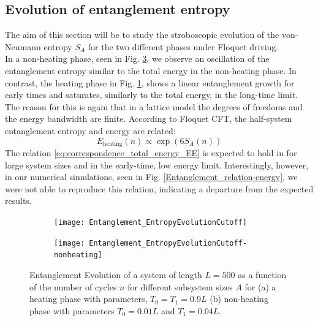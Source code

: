 \documentclass[11pt, a4paper, oneside]{book}
\theoremstyle{definition} %
\begin{document}
\subsection{Evolution of entanglement entropy}
The aim of this section will be to study the stroboscopic evolution of the von-Neumann entropy $S_A$ for the two different phases under Floquet driving. \\

In a non-heating phase, seen in Fig. \ref{EntanglementEvolutionNonHeating}, we observe an oscillation of the entanglement entropy similar to the total energy in the non-heating phase. In contrast, the heating phase in Fig. \ref{EntanglementEvolutionHeating}, shows a linear entanglement growth for early times and saturates, similarly to the total energy, in the long-time limit. The reason for this is again that in a lattice model the degrees of freedoms and the energy bandwidth are finite. According to Floquet CFT, the half-system entanglement entropy and energy are related:
\begin{equation}
	E_\text{heating}(n) \propto \exp(6S_A(n))
	\label{eq:correspondence_total_energy_EE}
\end{equation}
The relation \ref{eq:correspondence_total_energy_EE} is expected to hold in for large system sizes and in the early-time, low energy limit. Interestingly, however, in our numerical simulations, seen in Fig. \ref{Entanglement_relation-energy}, we were not able to reproduce this relation, indicating a departure from the expected results.


\begin{figure}[h]
\centering
\begin{subfigure}[t]{0.49\textwidth}
	\centering
	\texttt{[image: Entanglement\_EntropyEvolutionCutoff]}
	\caption{}
	\label{EntanglementEvolutionHeating}
\end{subfigure}
\begin{subfigure}[t]{0.49\textwidth}
	\centering
	\texttt{[image: Entanglement\_EntropyEvolutionCutoff-nonheating]}
	\caption{}
	\label{EntanglementEvolutionNonHeating}
\end{subfigure}
\caption{Entanglement Evolution of a system of length $L = 500$ as a function of the number of cycles $n$ for different subsystem sizes $A$ for (a) a heating phase with parameters, $T_0 = T_1 =0.9L$ (b) non-heating phase with parameters $T_0 = 0.01L$ and $T_1 = 0.04L$.}
\end{figure}
\end{document}
